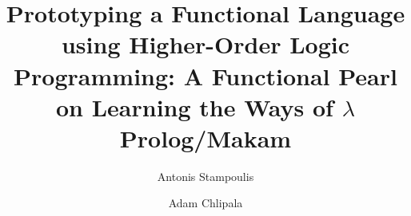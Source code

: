 \documentclass[acmsmall,screen]{acmart}
\begin{document}
\title[Prototyping a Functional Language using Higher-Order Logic Programming]{Prototyping a Functional Language using Higher-Order Logic Programming: A Functional Pearl on Learning the Ways of $\lambda$Prolog/Makam}

\author{Antonis Stampoulis}

\author{Adam Chlipala}

\newcommand\TODO[0]{\textbf{TODO}}
\newcommand\lamprolog[0]{\foreignlanguage{greek}{λ}Prolog\xspace}
\newcommand\fomega[0]{F$\omega$\xspace}

\newcommand\colorone[1]{\textcolor[rgb]{0.00,0.29,0.09}{#1}} %
\newcommand\colortwo[1]{\textcolor[rgb]{0.49,0.11,0.00}{#1}} %
\newcommand\colorthree[1]{\textcolor[rgb]{0.02,0.16,0.49}{#1}} %
\newcommand\colorfour[1]{\textcolor[rgb]{0.4,0.0,0.55}{#1}} %

\newsavebox{\selvestebox}
\newtoggle{important}
\togglefalse{important}
\newcommand\importantCodeblock[0]{\toggletrue{important}}
\newcommand\importantCodeblockEnd[0]{\togglefalse{important}}
\renewenvironment{verbatim}{\iftoggle{important}{\newenvironment{colbox}{\begin{lrbox}{\selvestebox}%
   \begin{minipage}{\dimexpr\columnwidth-2\fboxsep\relax}}{\end{minipage}\end{lrbox}%
   \begin{center}\hspace{-6pt}%
   \colorbox{accentbgcolor}{\usebox{\selvestebox}}%
   \end{center}}}{\newenvironment{colbox}{}{}}%
\begin{colbox}\begin{quote}\begin{alltt}}{\end{alltt}\end{quote}\end{colbox}}
\newcommand\highlightedtext[1]{{\setlength{\fboxsep}{2pt}\colorbox{accentbgcolor}{#1}}}
\end{document}
